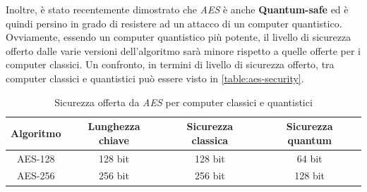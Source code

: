 Inoltre, è stato recentemente dimostrato che \emph{AES} è anche \textbf{Quantum-safe} ed è quindi persino in grado di resistere ad un attacco di un computer quantistico. Ovviamente, essendo un computer quantistico più potente, il livello di sicurezza offerto dalle varie versioni dell'algoritmo sarà minore rispetto a quelle offerte per i computer classici. Un confronto, in termini di livello di sicurezza offerto, tra computer classici e quantistici può essere visto in \autoref{table:aes-security}. \cite{aes_quantum_safe}

\begin{table}[h]
    \centering
    \begin{tabular}{| c | c | c | c |}
        \hline
        \textbf{Algoritmo} & \textbf{Lunghezza chiave} & \textbf{Sicurezza classica} &\textbf{Sicurezza quantum} \\
        \hline
        AES-128 & 128 bit & 128 bit & 64 bit \\
        \hline
        AES-256 & 256 bit & 256 bit & 128 bit \\
        \hline
    \end{tabular}
    \caption{Sicurezza offerta da \emph{AES} per computer classici e quantistici}
    \label{table:aes-security}
\end{table}

\newpage